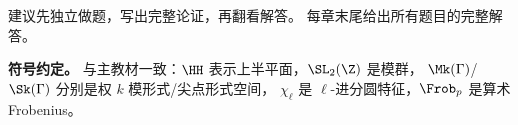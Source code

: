 \documentclass[12pt, a4paper, openany]{book}
\begin{document}
建议先独立做题，写出完整论证，再翻看解答。
每章末尾给出所有题目的完整解答。

\medskip
\textbf{符号约定。}
与主教材一致：$\HH$ 表示上半平面，$\SL_2(\Z)$ 是模群，
$\Mk(\Gamma)$/$\Sk(\Gamma)$ 分别是权 $k$ 模形式/尖点形式空间，
$\chi_\ell$ 是 $\ell$-进分圆特征，$\Frob_p$ 是算术 Frobenius。

\tableofcontents
\newpage














\appendix

\end{document}
